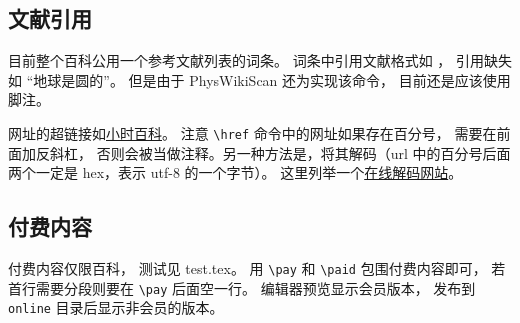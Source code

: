 
\subsection{文献引用}
目前整个百科公用一个参考文献列表的词条。 词条中引用文献格式如 \cite{PhysWiki}， 引用缺失如 “地球是圆的\needCite”。 但是由于 PhysWikiScan 还为实现该命令， 目前还是应该使用脚注。

网址的超链接如\href{https://wuli.wiki}{小时百科}。 注意 \verb|\href| 命令中的网址如果存在百分号， 需要在前面加反斜杠， 否则会被当做注释。另一种方法是，将其解码（url 中的百分号后面两个一定是 hex，表示 utf-8 的一个字节）。 这里列举一个\href{https://www.webatic.com/url-convertor}{在线解码网站}。

\subsection{付费内容}
付费内容仅限百科， 测试见 test.tex。 用 \verb|\pay| 和 \verb|\paid| 包围付费内容即可， 若首行需要分段则要在 \verb|\pay| 后面空一行。 编辑器预览显示会员版本， 发布到 \verb|online| 目录后显示非会员的版本。

